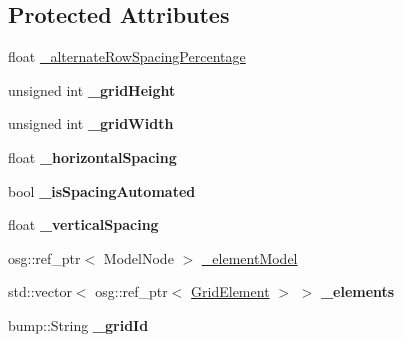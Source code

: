\subsection*{Protected Attributes}
\begin{DoxyCompactItemize}
\item 
float \hyperlink{class_grid_structure2_d_ab63375bf820bbe676613711abd32d3a6}{\_\-alternateRowSpacingPercentage}
\item 
\hypertarget{class_grid_structure2_d_a194f84ee5f0e7c8f26b6946619081446}{
unsigned int {\bfseries \_\-gridHeight}}
\label{class_grid_structure2_d_a194f84ee5f0e7c8f26b6946619081446}

\item 
\hypertarget{class_grid_structure2_d_a08fbce78819239608efd9914085866a5}{
unsigned int {\bfseries \_\-gridWidth}}
\label{class_grid_structure2_d_a08fbce78819239608efd9914085866a5}

\item 
\hypertarget{class_grid_structure2_d_a49a98552cc7a258ec6cbfa9490bd3b5d}{
float {\bfseries \_\-horizontalSpacing}}
\label{class_grid_structure2_d_a49a98552cc7a258ec6cbfa9490bd3b5d}

\item 
\hypertarget{class_grid_structure2_d_ab73f9956dd1b2ab3d6f92e0dc6f9026d}{
bool {\bfseries \_\-isSpacingAutomated}}
\label{class_grid_structure2_d_ab73f9956dd1b2ab3d6f92e0dc6f9026d}

\item 
\hypertarget{class_grid_structure2_d_a66de8707f1c8e16935c653823ace127c}{
float {\bfseries \_\-verticalSpacing}}
\label{class_grid_structure2_d_a66de8707f1c8e16935c653823ace127c}

\item 
osg::ref\_\-ptr$<$ ModelNode $>$ \hyperlink{class_grid_structure2_d_a06190b1d1ab65bbc6dfcfa09f3d30c66}{\_\-elementModel}
\item 
\hypertarget{class_grid_structure2_d_aee640da755b48d0f5493afe1fca37365}{
std::vector$<$ osg::ref\_\-ptr$<$ \hyperlink{class_grid_element}{GridElement} $>$ $>$ {\bfseries \_\-elements}}
\label{class_grid_structure2_d_aee640da755b48d0f5493afe1fca37365}

\item 
\hypertarget{class_grid_structure2_d_a9e09946900085b2c9de42727f8aac93a}{
bump::String {\bfseries \_\-gridId}}
\label{class_grid_structure2_d_a9e09946900085b2c9de42727f8aac93a}

\end{DoxyCompactItemize}


